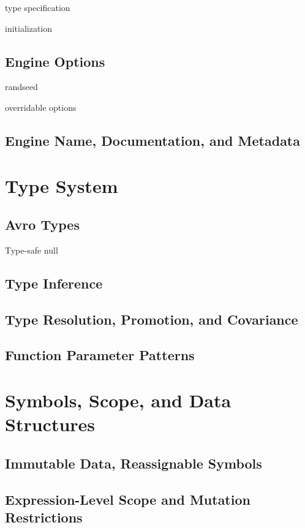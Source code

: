 \documentclass{article}
\begin{document}
type specification

initialization

\subsection{Engine Options}

randseed

overridable options

\subsection{Engine Name, Documentation, and Metadata}

\pagebreak

\section{Type System}

\subsection{Avro Types}

Type-safe null

\subsection{Type Inference}

\subsection{Type Resolution, Promotion, and Covariance}

\subsection{Function Parameter Patterns}

\pagebreak

\section{Symbols, Scope, and Data Structures}

\subsection{Immutable Data, Reassignable Symbols}

\subsection{Expression-Level Scope and Mutation Restrictions}
\end{document}
